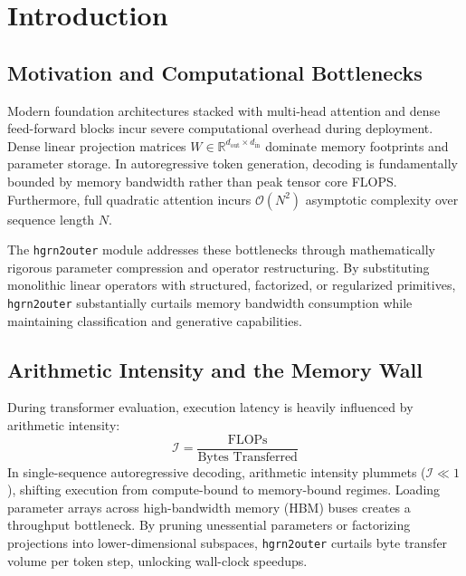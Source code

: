\section{Introduction}

\subsection{Motivation and Computational Bottlenecks}
Modern foundation architectures stacked with multi-head attention and dense feed-forward blocks incur severe computational overhead during deployment. Dense linear projection matrices $W \in \mathbb{R}^{d_{\text{out}} \times d_{\text{in}}}$ dominate memory footprints and parameter storage. In autoregressive token generation, decoding is fundamentally bounded by memory bandwidth rather than peak tensor core FLOPS. Furthermore, full quadratic attention incurs $\mathcal{O}(N^2)$ asymptotic complexity over sequence length $N$.

The \texttt{hgrn2outer} module addresses these bottlenecks through mathematically rigorous parameter compression and operator restructuring. By substituting monolithic linear operators with structured, factorized, or regularized primitives, \texttt{hgrn2outer} substantially curtails memory bandwidth consumption while maintaining classification and generative capabilities.

\subsection{Arithmetic Intensity and the Memory Wall}
During transformer evaluation, execution latency is heavily influenced by arithmetic intensity:
\[
\mathcal{I} = \frac{\text{FLOPs}}{\text{Bytes Transferred}}
\]
In single-sequence autoregressive decoding, arithmetic intensity plummets ($\mathcal{I} \ll 1$), shifting execution from compute-bound to memory-bound regimes. Loading parameter arrays across high-bandwidth memory (HBM) buses creates a throughput bottleneck. By pruning unessential parameters or factorizing projections into lower-dimensional subspaces, \texttt{hgrn2outer} curtails byte transfer volume per token step, unlocking wall-clock speedups.

